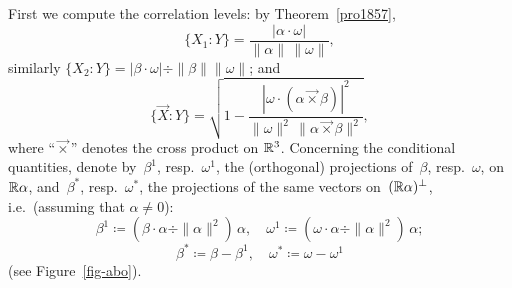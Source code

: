 First we compute the correlation levels:
by Theorem~\ref{pro1857},
\[ \{X_1:Y\} = \frac{|\alpha \cdot \omega|}{\|\alpha\| \, \|\omega\|} ,\]
similarly $\{X_2:Y\} = |\beta \cdot \omega| \div \|\beta\|\|\omega\|$; and
\[ \{\vec{X}:Y\} = \sqrt{1-\frac{|\omega\cdot(\alpha\vec{\times}\beta)|^2}{\|\omega\|^2\,\|\alpha\vec{\times}\beta\|^2}}, \]
where ``$\vec{\times}$'' denotes the cross product on $\mathbb{R}^3$.
%
Concerning the conditional quantities,
denote by~$\beta^1$, resp.~$\omega^1$, the (orthogonal) projections of~$\beta$, resp.~$\omega$, on~$\mathbb{R}\alpha$,
and~$\beta^*$, resp.~$\omega^*$, the projections of the same vectors on~$(\mathbb{R}\alpha)^\perp$,
i.e.\ (assuming that $\alpha\neq0$):
\[ \beta^1 \coloneqq (\beta\cdot\alpha \div \|\alpha\|^2)\,\alpha , \quad
\omega^1 \coloneqq (\omega\cdot\alpha \div \|\alpha\|^2)\,\alpha ; \]
\[ \beta^* \coloneqq \beta - \beta^1 , \quad
\omega^* \coloneqq \omega - \omega^1 \]
(see Figure~\ref{fig-abo}).
%

